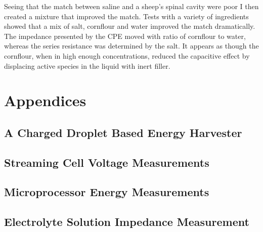     Seeing that the match between saline and a sheep's spinal cavity were poor I then created a mixture that improved the match.
    Tests with a variety of ingredients showed that a mix of salt, cornflour and water improved the match dramatically.
    The impedance presented by the CPE moved with ratio of cornflour to water, whereas the series resistance was determined by the salt.
    It appears as though the cornflour, when in high enough concentrations, reduced the capacitive effect by displacing active species in the liquid with inert filler.



 \part{Appendices}

   \appendix

   \chapter{A Charged Droplet Based Energy Harvester}
     \label{appendix:chargedDropletts}
     

   \chapter{Streaming Cell Voltage Measurements}
     \label{appendix:streamingCellMeasurements}
     

   \chapter{Microprocessor Energy Measurements}
     

   \chapter{Electrolyte Solution Impedance Measurement}
     

